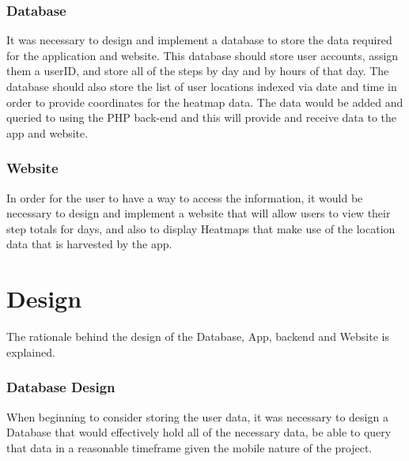 \documentclass{l4proj}
\begin{document}
\subsection{Database}

It was necessary to design and implement a database to store the data required for the application and website. This database should store user accounts, assign them a userID, and store all of the steps by day and by hours of that day. The database should also store the list of user locations indexed via date and time in order to provide coordinates  for the heatmap data. The data would be added and queried to using the PHP back-end and this will provide and receive data to the app and website.

\subsection{Website}

In order for the user to have a way to access the information, it would be necessary to design and implement a website that will allow users to view their step totals for days, and also to display Heatmaps that make use of the location data that is harvested by the app.


\chapter{Design}

The rationale behind the design of the Database, App, backend and Website is explained.
\subsection{Database Design}

When beginning to consider storing the user data, it was necessary to design a Database that would effectively hold all of the necessary data, be able to query that data in a reasonable timeframe given the mobile nature of the project.
\end{document}
